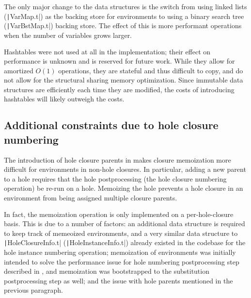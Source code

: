 The only major change to the data structures is the switch from using linked lists (\texttt|VarMap.t|) as the backing store for environments to using a binary search tree (\texttt|VarBstMap.t|) backing store. The effect of this is more performant operations when the number of variables grows larger.

Hashtables were not used at all in the implementation; their effect on performance is unknown and is reserved for future work. While they allow for amortized $O(1)$ operations, they are stateful and thus difficult to copy, and do not allow for the structural sharing memory optimization. Since immutable data structures are efficiently each time they are modified, the costs of introducing hashtables will likely outweigh the costs.

\subsection{Additional constraints due to hole closure numbering}
\label{sec:difficulties-hole-numbering}

The introduction of hole closure parents in  makes closure memoization more difficult for environments in non-hole closures. In particular, adding a new parent to a hole requires that the hole postprocessing (the hole closure numbering operation) be re-run on a hole. Memoizing the hole prevents a hole closure in an environment from being assigned multiple closure parents.

In fact, the memoization operation is only implemented on a per-hole-closure basis. This is due to a number of factors: an additional data structure is required to keep track of memeoized environments, and a very similar data structure to \texttt|HoleClosureInfo.t| (\texttt|HoleInstanceInfo.t|) already existed in the codebase for the hole instance numbering operation; memoization of environments was initially intended to solve the performance issue for hole numbering postprocessing step described in , and memoization was bootstrapped to the substitution postprocessing step as well; and the issue with hole parents mentioned in the previous paragraph.

